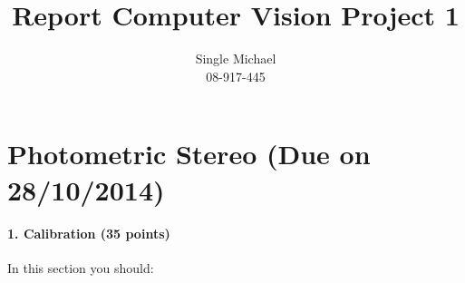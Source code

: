 \documentclass{paper}
\title{Report Computer Vision Project 1}
\author{Single Michael\\08-917-445}
\begin{document}
\maketitle


%

\section{Photometric Stereo (Due on 28/10/2014)}



\paragraph{1. Calibration (35 points)}
In this section you should:
\end{document}
